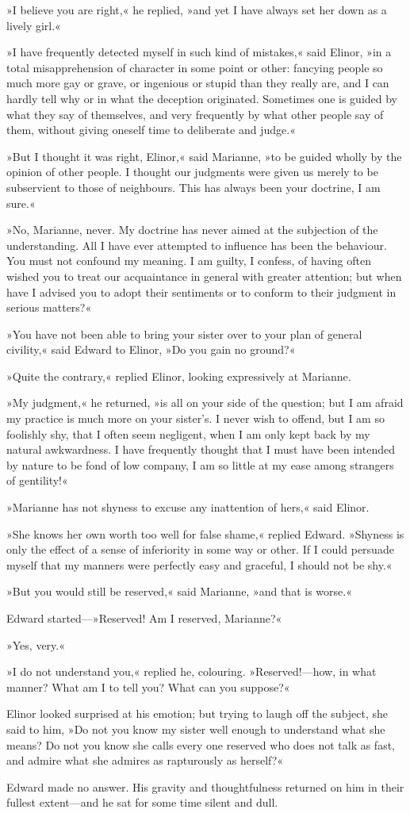 »I believe you are right,« he replied, »and yet I have always set her down as a lively girl.«

»I have frequently detected myself in such kind of mistakes,« said Elinor, »in a total misapprehension of character in some point or other: fancying people so much more gay or grave, or ingenious or stupid than they really are, and I can hardly tell why or in what the deception originated. Sometimes one is guided by what they say of themselves, and very frequently by what other people say of them, without giving oneself time to deliberate and judge.«

»But I thought it was right, Elinor,« said Marianne, »to be guided wholly by the opinion of other people. I thought our judgments were given us merely to be subservient to those of neighbours. This has always been your doctrine, I am sure.«

»No, Marianne, never. My doctrine has never aimed at the subjection of the understanding. All I have ever attempted to influence has been the behaviour. You must not confound my meaning. I am guilty, I confess, of having often wished you to treat our acquaintance in general with greater attention; but when have I advised you to adopt their sentiments or to conform to their judgment in serious matters?«

»You have not been able to bring your sister over to your plan of general civility,« said Edward to Elinor, »Do you gain no ground?«

»Quite the contrary,« replied Elinor, looking expressively at Marianne.

»My judgment,« he returned, »is all on your side of the question; but I am afraid my practice is much more on your sister’s. I never wish to offend, but I am so foolishly shy, that I often seem negligent, when I am only kept back by my natural awkwardness. I have frequently thought that I must have been intended by nature to be fond of low company, I am so little at my ease among strangers of gentility!«

»Marianne has not shyness to excuse any inattention of hers,« said Elinor.

»She knows her own worth too well for false shame,« replied Edward. »Shyness is only the effect of a sense of inferiority in some way or other. If I could persuade myself that my manners were perfectly easy and graceful, I should not be shy.«

»But you would still be reserved,« said Marianne, »and that is worse.«

Edward started—»Reserved! Am I reserved, Marianne?«

»Yes, very.«

»I do not understand you,« replied he, colouring. »Reserved!—how, in what manner? What am I to tell you? What can you suppose?«

Elinor looked surprised at his emotion; but trying to laugh off the subject, she said to him, »Do not you know my sister well enough to understand what she means? Do not you know she calls every one reserved who does not talk as fast, and admire what she admires as rapturously as herself?«

Edward made no answer. His gravity and thoughtfulness returned on him in their fullest extent—and he sat for some time silent and dull.
